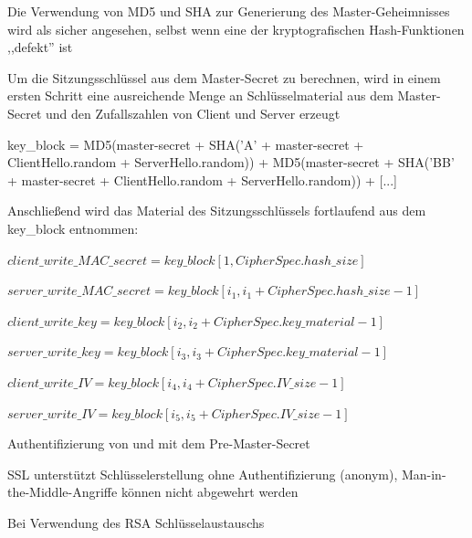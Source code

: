 \documentclass[a4paper]{article}
\begin{document}
\begin{multicols}{3}
\begin{itemize*}
\begin{itemize*}
            \end{itemize*}
            \item Die Verwendung von MD5 und SHA zur Generierung des Master-Geheimnisses wird als sicher angesehen, selbst wenn eine der kryptografischen Hash-Funktionen ,,defekt'' ist
            \item Um die Sitzungsschlüssel aus dem Master-Secret zu berechnen, wird in einem ersten Schritt eine ausreichende Menge an Schlüsselmaterial aus dem Master-Secret und den Zufallszahlen von Client und Server erzeugt
            \begin{itemize*}
                  \item key\_block = MD5(master-secret + SHA('A' + master-secret + ClientHello.random + ServerHello.random)) + MD5(master-secret + SHA('BB' + master-secret + ClientHello.random + ServerHello.random)) + [...]
            \end{itemize*}
            \item Anschließend wird das Material des Sitzungsschlüssels fortlaufend aus dem key\_block entnommen:
            \begin{itemize*}
                  \item $client\_write\_MAC\_secret = key\_block[1, CipherSpec.hash\_size]$
                  \item $server\_write\_MAC\_secret = key\_block[i_1 , i_1 + CipherSpec.hash\_size - 1]$
                  \item $client\_write\_key = key\_block[i_2 , i_2 + CipherSpec.key\_material - 1]$
                  \item $server\_write\_key = key\_block[i_3 , i_3 + CipherSpec.key\_material - 1]$
                  \item $client\_write\_IV = key\_block[i_4 , i_4 + CipherSpec.IV\_size - 1]$
                  \item $server\_write\_IV = key\_block[i_5 , i_5 + CipherSpec.IV\_size - 1]$
            \end{itemize*}
            \item Authentifizierung von und mit dem Pre-Master-Secret
            \begin{itemize*}
                  \item SSL unterstützt Schlüsselerstellung ohne Authentifizierung (anonym), Man-in-the-Middle-Angriffe können nicht abgewehrt werden
                  \item Bei Verwendung des RSA Schlüsselaustauschs
                  \begin{itemize*}

\end{itemize*}
\end{itemize*}
\end{itemize*}
\end{multicols}
\end{document}
